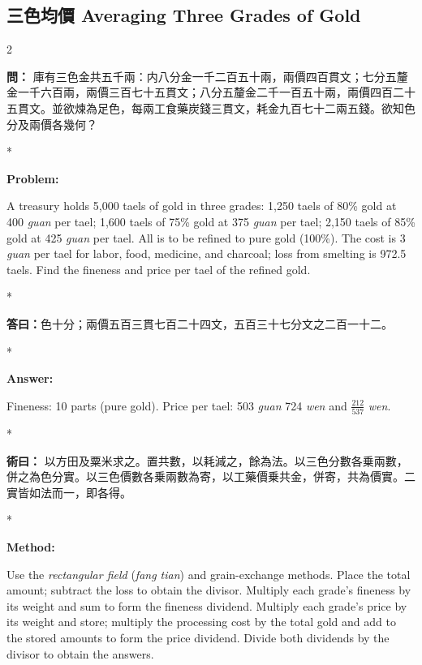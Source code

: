 \documentclass[11pt,a4paper]{article}
\newcommand{\CnQuestion}[1]{\par\noindent\textbf{\color{problemcolor}問：}#1\par\vspace{0.5ex}}
\newcommand{\CnAnswer}[1]{\par\noindent\textbf{\color{answercolor}答曰：}#1\par\vspace{0.5ex}}
\newcommand{\CnMethod}[1]{\par\noindent\textbf{\color{methodcolor}術曰：}#1\par\vspace{0.5ex}}
\newcommand{\EnQuestion}{\par\noindent\textbf{\color{problemcolor}Problem:}\par\vspace{0.5ex}}
\newcommand{\EnAnswer}{\par\noindent\textbf{\color{answercolor}Answer:}\par\vspace{0.5ex}}
\newcommand{\EnMethod}{\par\noindent\textbf{\color{methodcolor}Method:}\par\vspace{0.5ex}}
\newcommand{\switchCn}{\switchcolumn[0]*}
\newcommand{\switchEn}{\switchcolumn[1]*}
\begin{document}
\vspace{1.5em}

\subsection*{三色均價 \quad Averaging Three Grades of Gold}

\begin{paracol}{2}

\CnQuestion{%
庫有三色金共五千兩：内八分金一千二百五十兩，兩價四百貫文；七分五釐金一千六百兩，兩價三百七十五貫文；八分五釐金二千一百五十兩，兩價四百二十五貫文。並欲煉為足色，每兩工食藥炭錢三貫文，耗金九百七十二兩五錢。欲知色分及兩價各幾何？
}

\switchEn

\EnQuestion
A treasury holds 5,000 taels of gold in three grades: 1,250 taels of 80\% gold at 400 \textit{guan} per tael; 1,600 taels of 75\% gold at 375 \textit{guan} per tael; 2,150 taels of 85\% gold at 425 \textit{guan} per tael. All is to be refined to pure gold (100\%). The cost is 3 \textit{guan} per tael for labor, food, medicine, and charcoal; loss from smelting is 972.5 taels. Find the fineness and price per tael of the refined gold.

\switchCn

\CnAnswer{色十分；兩價五百三貫七百二十四文，五百三十七分文之二百一十二。}

\switchEn

\EnAnswer
Fineness: 10 parts (pure gold). Price per tael: 503 \textit{guan} 724 \textit{wen} and $\frac{212}{537}$ \textit{wen}.

\switchCn

\CnMethod{%
以方田及粟米求之。置共數，以耗減之，餘為法。以三色分數各乗兩數，併之為色分實。以三色價數各乗兩數為寄，以工藥價乗共金，併寄，共為價實。二實皆如法而一，即各得。
}

\switchEn

\EnMethod
Use the \textit{rectangular field} (\textit{fang tian}) and grain-exchange methods. Place the total amount; subtract the loss to obtain the divisor. Multiply each grade's fineness by its weight and sum to form the fineness dividend. Multiply each grade's price by its weight and store; multiply the processing cost by the total gold and add to the stored amounts to form the price dividend. Divide both dividends by the divisor to obtain the answers.


\end{paracol}
\end{document}
